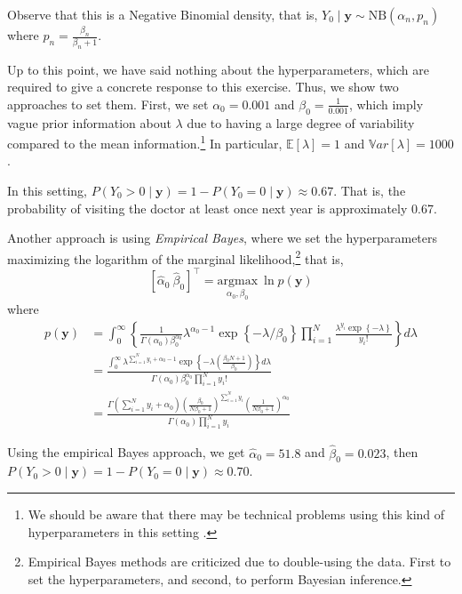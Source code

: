 Observe that this is a Negative Binomial density, that is, \( Y_0 \mid \mathbf{y} \sim \text{NB}(\alpha_n, p_n) \) where \( p_n = \frac{\beta_n}{\beta_n + 1} \).

Up to this point, we have said nothing about the hyperparameters, which are required to give a concrete response to this exercise. Thus, we show two approaches to set them. First, we set \( \alpha_0 = 0.001 \) and \( \beta_0 = \frac{1}{0.001} \), which imply vague prior information about \( \lambda \) due to having a large degree of variability compared to the mean information.\footnote{We should be aware that there may be technical problems using this kind of hyperparameters in this setting \cite{gelman2006prior}.} In particular, \( \mathbb{E}[\lambda] = 1 \) and \( \mathbb{V}ar[\lambda] = 1000 \).

In this setting, \( P(Y_0 > 0 \mid \mathbf{y}) = 1 - P(Y_0 = 0 \mid \mathbf{y}) \approx 0.67 \). That is, the probability of visiting the doctor at least once next year is approximately 0.67.

Another approach is using \textit{Empirical Bayes}, where we set the hyperparameters maximizing the logarithm of the marginal likelihood,\footnote{Empirical Bayes methods are criticized due to double-using the data. First to set the hyperparameters, and second, to perform Bayesian inference.} that is,
\[
\left[\hat{\alpha}_0 \ \hat{\beta}_0\right]^{\top} = \underset{\alpha_0, \beta_0}{\mathrm{argmax}} \ \ln p(\mathbf{y})
\]
where
\begin{align*}
	p(\mathbf{y})&=\int_0^{\infty}\left\{\frac{1}{\Gamma(\alpha_0)\beta_0^{\alpha_0}}\lambda^{\alpha_0-1}\exp\left\{-\lambda/\beta_0\right\} \prod_{i=1}^N\frac{\lambda^{y_i}\exp\left\{-\lambda\right\}}{ y_i!}\right\}d\lambda\\
	&=\frac{\int_0^{\infty}\lambda^{\sum_{i=1}^N y_i+\alpha_0-1}\exp\left\{-\lambda \left(\frac{\beta_0 N +1}{\beta_0}\right) \right\}d\lambda}{\Gamma(\alpha_0)\beta_0^{\alpha_0}\prod_{i=1}^N y_i!}\\
	&=\frac{\Gamma(\sum_{i=1}^N y_i+\alpha_0)\left(\frac{\beta_0}{N\beta_0+1}\right)^{\sum_{i=1}^N y_i}\left(\frac{1}{N\beta_0+1}\right)^{\alpha_0}}{\Gamma(\alpha_0)\prod_{i=1}^N y_i}
\end{align*}

Using the empirical Bayes approach, we get $\hat{\alpha}_0 = 51.8$ and $\hat{\beta}_0 = 0.023$, then $P(Y_0 > 0 \mid \mathbf{y}) = 1 - P(Y_0 = 0 \mid \mathbf{y}) \approx 0.70$.

